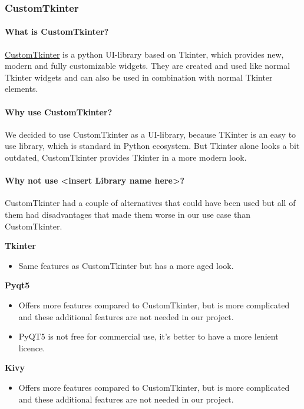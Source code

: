 \documentclass[parskip=full]{scrartcl} %
\begin{document}
\subsubsection{CustomTkinter}

\paragraph{What is CustomTkinter?}
\href{https://github.com/TomSchimansky/CustomTkinter}{CustomTkinter} is a python UI-library based on Tkinter, which provides new, modern and fully customizable widgets. They are created and used like normal Tkinter widgets and can also be used in combination with normal Tkinter elements. 

\paragraph{Why use CustomTkinter?}
We decided to use CustomTkinter as a UI-library, because TKinter is an easy to use library, which is standard in Python ecosystem.
But Tkinter alone looks a bit outdated, CustomTkinter provides Tkinter in a more modern look.

\paragraph{Why not use <insert Library name here>?}
CustomTkinter had a couple of alternatives that could have been used but all of them had disadvantages that made them worse in our use case than CustomTkinter. 
  
\textbf{Tkinter}
\begin{itemize}
    \item Same features as CustomTkinter but has a more aged look.
\end{itemize}
  
\textbf{Pyqt5}
\begin{itemize}
    \item Offers more features compared to CustomTkinter, but is more complicated and these additional features are not needed in our project.
    \item PyQT5 is not free for commercial use, it's better to have a more lenient licence.
\end{itemize}
\textbf{Kivy}
\begin{itemize}
    \item Offers more features compared to CustomTkinter, but is more complicated and these additional features are not needed in our project. 
\end{itemize}
\end{document}
